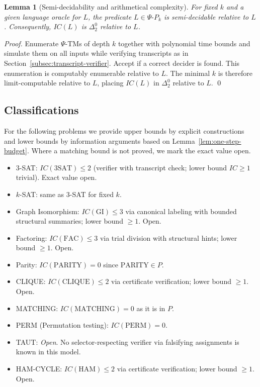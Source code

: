 \documentclass[11pt]{article}
\newtheorem{lemma}[theorem]{Lemma}
\theoremstyle{definition}
\newcommand{\PSi}{\Psi}
\begin{document}
\begin{lemma}[Semi-decidability and arithmetical complexity]
For fixed $k$ and a given language oracle for $L$, the predicate $L\in\Psi\text{-}P_k$ is semi-decidable relative to $L$. Consequently, $IC(L)$ is $\Delta^0_2$ relative to $L$.
\end{lemma}
\begin{proof}
Enumerate $\PSi$-TMs of depth $k$ together with polynomial time bounds and simulate them on all inputs while verifying transcripts as in Section~\ref{subsec:transcript-verifier}. Accept if a correct decider is found. This enumeration is computably enumerable relative to $L$. The minimal $k$ is therefore limit-computable relative to $L$, placing $IC(L)$ in $\Delta^0_2$ relative to $L$. \qed
\end{proof}

\subsection{Classifications}

For the following problems we provide upper bounds by explicit constructions and lower bounds by information arguments based on Lemma~\ref{lem:one-step-budget}. Where a matching bound is not proved, we mark the exact value open.

\begin{itemize}
  \item 3-SAT: $IC(\mathrm{3SAT})\le 2$ (verifier with transcript check; lower bound $IC\ge1$ trivial). Exact value open.
  \item $k$-SAT: same as 3-SAT for fixed $k$.
  \item Graph Isomorphism: $IC(\mathrm{GI})\le 3$ via canonical labeling with bounded structural summaries; lower bound $\ge1$. Open.
  \item Factoring: $IC(\mathrm{FAC})\le 3$ via trial division with structural hints; lower bound $\ge1$. Open.
  \item Parity: $IC(\mathrm{PARITY})=0$ since $\mathrm{PARITY}\in P$.
  \item CLIQUE: $IC(\mathrm{CLIQUE})\le 2$ via certificate verification; lower bound $\ge1$. Open.
  \item MATCHING: $IC(\mathrm{MATCHING})=0$ as it is in $P$.
  \item PERM (Permutation testing): $IC(\mathrm{PERM})=0$.
  \item TAUT: \emph{Open}. No selector-respecting verifier via falsifying assignments is known in this model.
  \item HAM-CYCLE: $IC(\mathrm{HAM})\le 2$ via certificate verification; lower bound $\ge1$. Open.
\end{itemize}
\end{document}
